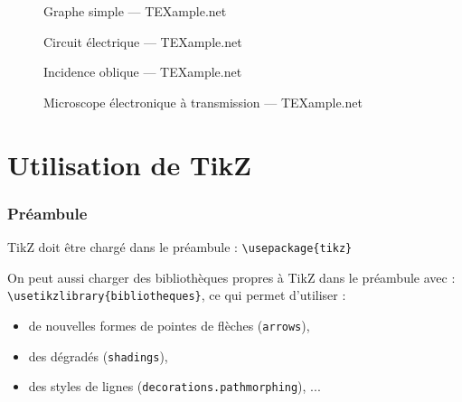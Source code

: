 \begin{frame}
  \begin{figure}
    \centering
    \tikzexc
    \caption{\footnotesize Graphe simple --- TEXample.net \cite{tikzandpgfexamples}}
  \end{figure}
\end{frame}

\begin{frame}
  \begin{figure}
    \centering
    \scalebox{0.7}{\tikzexe}
    \caption{\footnotesize Circuit électrique --- TEXample.net \cite{tikzandpgfexamples}}
  \end{figure}
\end{frame}

\begin{frame}
  \begin{figure}
    \centering
    \scalebox{0.7}{\tikzexd}
    \caption{\footnotesize Incidence oblique --- TEXample.net \cite{tikzandpgfexamples}}
  \end{figure}
\end{frame}

\begin{frame}
  \begin{figure}
    \centering
    \scalebox{0.7}{\tikzexb}
    \caption{\footnotesize Microscope électronique à transmission --- TEXample.net \cite{tikzandpgfexamples}}
  \end{figure}
\end{frame}



\section{Utilisation de TikZ}

\begin{frame}[fragile]
  \frametitle{Préambule}

TikZ doit être chargé dans le préambule :
\lstinline?\usepackage{tikz}?

\medskip
On peut aussi charger des bibliothèques propres à TikZ dans le préambule avec :
\lstinline?\usetikzlibrary{bibliotheques}?,
ce qui permet d'utiliser :
\begin{itemize}
  \item de nouvelles formes de pointes de flèches (\lstinline?arrows?),
  \item des dégradés (\lstinline?shadings?),
  \item des styles de lignes (\lstinline?decorations.pathmorphing?), ...
\end{itemize}
\end{frame}



